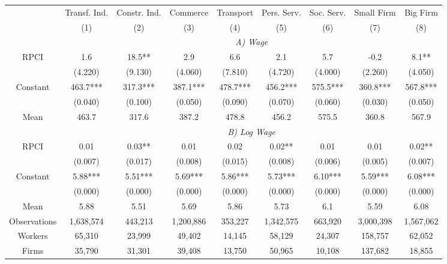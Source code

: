 \begin{tabular}{ccccccccc}
\toprule
\toprule
      & Transf. Ind. & Constr. Ind. & Commerce & Transport & Pers. Serv. & Soc. Serv. & Small Firm & Big Firm \\
      & (1)   & (2)   & (3)   & (4)   & (5)   & (6)   & (7)   & (8) \\
\cmidrule{2-9}      & \multicolumn{8}{c}{\textit{A) Wage}} \\
\midrule
RPCI  & 1.6   & 18.5** & 2.9   & 6.6   & 2.1   & 5.7   & -0.2  & 8.1** \\
      & (4.220) & (9.130) & (4.060) & (7.810) & (4.720) & (4.000) & (2.260) & (4.050) \\
Constant & 463.7*** & 317.3*** & 387.1*** & 478.7*** & 456.2*** & 575.5*** & 360.8*** & 567.8*** \\
      & (0.040) & (0.100) & (0.050) & (0.090) & (0.070) & (0.060) & (0.030) & (0.050) \\
Mean  & 463.7 & 317.6 & 387.2 & 478.8 & 456.2 & 575.5 & 360.8 & 567.9 \\
\cmidrule{2-9}      & \multicolumn{8}{c}{\textit{B) Log Wage}} \\
\midrule
RPCI  & 0.01  & 0.03** & 0.01  & 0.02  & 0.02** & 0.01  & 0.01  & 0.02** \\
      & (0.007) & (0.017) & (0.008) & (0.015) & (0.008) & (0.006) & (0.005) & (0.007) \\
Constant & 5.88*** & 5.51*** & 5.69*** & 5.86*** & 5.73*** & 6.10*** & 5.59*** & 6.08*** \\
      & (0.000) & (0.000) & (0.000) & (0.000) & (0.000) & (0.000) & (0.000) & (0.000) \\
Mean  & 5.88  & 5.51  & 5.69  & 5.86  & 5.73  & 6.1   & 5.59  & 6.08 \\
\midrule
Observations & 1,638,574 & 443,213 & 1,200,886 & 353,227 & 1,342,575 & 663,920 & 3,000,398 & 1,567,062 \\
Workers & 65,310 & 23,999 & 49,402 & 14,145 & 58,129 & 24,307 & 158,757 & 62,052 \\
Firms & 35,790 & 31,301 & 39,408 & 13,750 & 50,965 & 10,108 & 137,682 & 18,855 \\
\bottomrule
\bottomrule
\end{tabular}%

